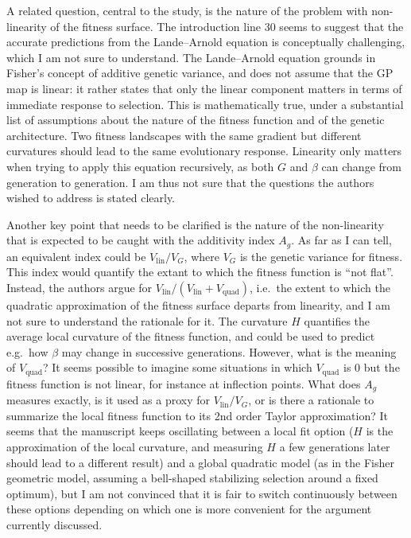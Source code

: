 \documentclass[11pt,a4paper]{article}
\newcommand{\Vlin}{\ensuremath{V_{\mathrm{lin}}}\xspace}
\newcommand{\Vquad}{\ensuremath{V_{\mathrm{quad}}}\xspace}
\begin{document}
\begin{revquote}
A related question, central to the study, is the nature of the problem with non-linearity of the fitness surface. The introduction line 30 seems to suggest that the accurate predictions from the Lande--Arnold equation is conceptually challenging, which I am not sure to understand. The Lande--Arnold equation grounds in Fisher's concept of additive genetic variance, and does not assume that the GP map is linear: it rather states that only the linear component matters in terms of immediate response to selection. This is mathematically true, under a substantial list of assumptions about the nature of the fitness function and of the genetic architecture. Two fitness landscapes with the same gradient but different curvatures should lead to the same evolutionary response. Linearity only matters when trying to apply this equation recursively, as both $G$ and $\beta$ can change from generation to generation. I am thus not sure that the questions the authors wished to address is stated clearly.

Another key point that needs to be clarified is the nature of the non-linearity that is expected to be caught with the additivity index $A_g$. As far as I can tell, an equivalent index could be $\Vlin/V_G$, where $V_G$ is the genetic variance for fitness. This index would quantify the extant to which the fitness function is ``not flat''. Instead, the authors argue for $\Vlin/(\Vlin+\Vquad)$, i.e.\ the extent to which the quadratic approximation of the fitness surface departs from linearity, and I am not sure to understand the rationale for it. The curvature $H$ quantifies the average local curvature of the fitness function, and could be used to predict e.g.\ how $\beta$ may change in successive generations. However, what is the meaning of $\Vquad$? It seems possible to imagine some situations in which $\Vquad$ is 0 but the fitness function is not linear, for instance at inflection points. What does $A_g$ measures exactly, is it used as a proxy for $\Vlin/V_G$, or is there a rationale to summarize the local fitness function to its 2nd order Taylor approximation? It seems that the manuscript keeps oscillating between a local fit option ($H$ is the approximation of the local curvature, and measuring $H$ a few generations later should lead to a different result) and a global quadratic model (as in the Fisher geometric model, assuming a bell-shaped stabilizing selection around a fixed optimum), but I am not convinced that it is fair to switch continuously between these options depending on which one is more convenient for the argument currently discussed.


\end{revquote}
\end{document}
